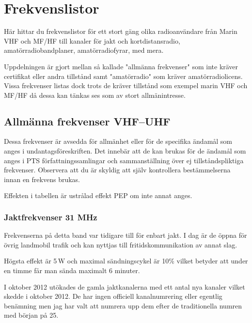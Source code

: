 
\chapter{Frekvenslistor}

Här hittar du frekvenslistor för ett stort gäng olika radioanvändare från
Marin VHF och MF/HF till kanaler för jakt och kortdistansradio,
amatörradiobandplaner, amatörradiofyrar, med mera.

Uppdelningen är gjort mellan så kallade "allmänna frekvenser" som inte kräver
certifikat eller andra tillstånd samt "amatörradio" som kräver
amatörradiolicens. Vissa frekvenser listas dock trots de kräver tillstånd som
exempel marin VHF och MF/HF då dessa kan tänkas ses som av stort
allmänintresse.

\clearpage

\section{Allmänna frekvenser VHF--UHF}

Dessa frekvenser är avsedda för allmänhet eller för de specifika ända\-mål som
anges i undantagsföreskriften. Det innebär att de kan brukas för de ändamål
som anges i PTS för\-fatt\-nings\-sam\-ling\-ar och sammanställning över ej
tillståndspliktiga frekvenser. Observera att du är skyldig att själv
kontrollera bestämmelserna innan en frekvens brukas.

Effekten i tabellen är ustrålad effekt PEP om inte annat anges.

\subsection{Jaktfrekvenser 31 MHz}

Frekvenserna på detta band var tidigare till för enbart jakt. I dag är de
öppna för övrig landmobil trafik och kan nyttjas till fritidskommunikation av
annat slag.

Högsta effekt är 5\,W och maximal sändningscykel är 10\% vilket betyder att
under en timme får man sända maximalt 6 minuter.

I oktober 2012 utökades de gamla jaktkanalerna med ett antal nya kanaler
vilket skedde i oktober 2012. De har ingen officiell kanalnumrering eller
egentlig benämning men jag har valt att numrera upp dem efter de traditionella
numren med början på 25.

